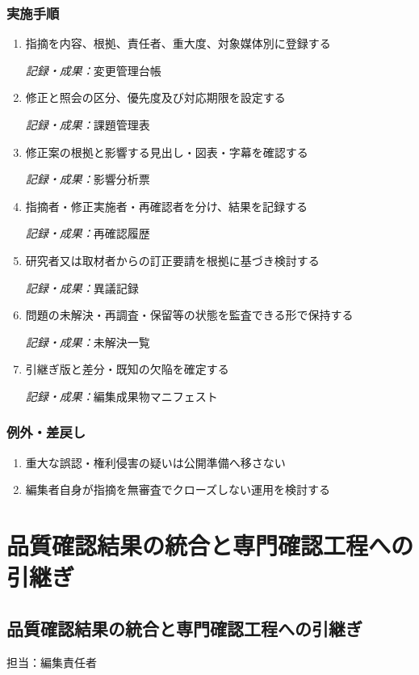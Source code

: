\documentclass[a4paper,11pt]{article}
\begin{document}
\subsubsection*{実施手順}
\begin{enumerate}[leftmargin=2em,itemsep=0.65em]
\item 指摘を内容、根拠、責任者、重大度、対象媒体別に登録する\par\noindent\textit{記録・成果：}変更管理台帳\nobreak\smallskip
\item 修正と照会の区分、優先度及び対応期限を設定する\par\noindent\textit{記録・成果：}課題管理表\nobreak\smallskip
\item 修正案の根拠と影響する見出し・図表・字幕を確認する\par\noindent\textit{記録・成果：}影響分析票\nobreak\smallskip
\item 指摘者・修正実施者・再確認者を分け、結果を記録する\par\noindent\textit{記録・成果：}再確認履歴\nobreak\smallskip
\item 研究者又は取材者からの訂正要請を根拠に基づき検討する\par\noindent\textit{記録・成果：}異議記録\nobreak\smallskip
\item 問題の未解決・再調査・保留等の状態を監査できる形で保持する\par\noindent\textit{記録・成果：}未解決一覧\nobreak\smallskip
\item 引継ぎ版と差分・既知の欠陥を確定する\par\noindent\textit{記録・成果：}編集成果物マニフェスト\nobreak\smallskip
\end{enumerate}
\subsubsection*{例外・差戻し}
\begin{enumerate}[leftmargin=2em,itemsep=0.35em]
\item 重大な誤認・権利侵害の疑いは公開準備へ移さない
\item 編集者自身が指摘を無審査でクローズしない運用を検討する
\end{enumerate}
\section{品質確認結果の統合と専門確認工程への引継ぎ}
\subsection{品質確認結果の統合と専門確認工程への引継ぎ}
\par 担当：編集責任者\par\medskip
\end{document}
